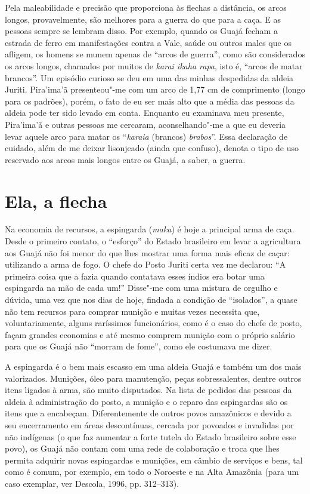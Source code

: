 Pela maleabilidade e precisão que proporciona às flechas a distância, os
arcos longos, provavelmente, são melhores para a guerra do que para a
caça. E as pessoas sempre se lembram disso. Por exemplo, quando os Guajá
fecham a estrada de ferro em manifestações contra a Vale, saúde ou
outros males que os afligem, os homens se munem apenas de ``arcos de
guerra'', como são considerados os arcos longos, chamados por muitos de
\emph{karai ikaha rapa}, isto é, ``arcos de matar brancos''. Um episódio
curioso se deu em uma das minhas despedidas da aldeia Juriti. Pira'ima'ã
presenteou"-me com um arco de 1,77 cm de comprimento (longo para os
padrões), porém, o fato de eu ser mais alto que a média das pessoas da
aldeia pode ter sido levado em conta. Enquanto eu examinava meu
presente, Pira'ima'ã e outras pessoas me cercaram, aconselhando"-me a que
eu deveria levar aquele arco para matar os ``\emph{karaia} (brancos)
\emph{brabos}''. Essa declaração de cuidado, além de me deixar lisonjeado
(ainda que confuso), denota o tipo de uso reservado aos arcos mais
longos entre os Guajá, a saber, a guerra.

\section{Ela, a flecha}\label{ela-a-flecha}

Na economia de recursos, a espingarda (\emph{maka}) é hoje a principal
arma de caça. Desde o primeiro contato, o ``esforço'' do Estado brasileiro
em levar a agricultura aos Guajá não foi menor do que lhes mostrar uma
forma mais eficaz de caçar: utilizando a arma de fogo. O chefe do Posto
Juriti certa vez me declarou: ``A primeira coisa que a  fazia quando
contatava esses índios era botar uma espingarda na mão de cada um!''
Disse"-me com uma mistura de orgulho e dúvida, uma vez que nos dias de
hoje, findada a condição de ``isolados'', a  quase não tem recursos
para comprar munição e muitas vezes necessita que, voluntariamente,
alguns raríssimos funcionários, como é o caso do chefe de posto, façam
grandes economias e até mesmo comprem munição com o próprio salário para
que os Guajá não ``morram de fome'', como ele costumava me dizer.

A espingarda é o bem mais escasso em uma aldeia Guajá e também um dos
mais valorizados. Munições, óleo para manutenção, peças sobressalentes,
dentre outros itens ligados à arma, são muito disputados. Na lista de
pedidos das pessoas da aldeia à administração do posto, a munição e o
reparo das espingardas são os itens que a encabeçam. Diferentemente de
outros povos amazônicos e devido a seu encerramento em áreas
descontínuas, cercada por povoados e invadidas por não indígenas (o que
faz aumentar a forte tutela do Estado brasileiro sobre esse povo), os
Guajá não contam com uma rede de colaboração e troca que lhes permita
adquirir novas espingardas e munições, em câmbio de serviços e bens, tal
como é comum, por exemplo, em todo o Noroeste e na Alta Amazônia (para
um caso exemplar, ver Descola, 1996, pp. 312--313).

